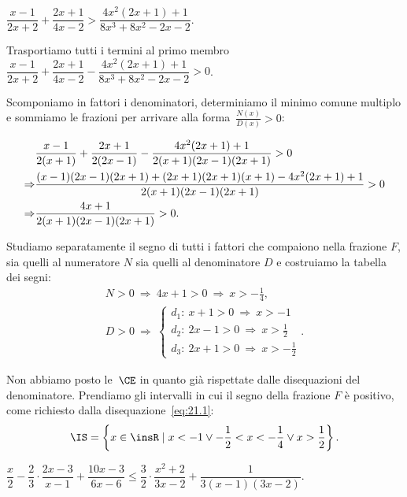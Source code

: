 \begin{exrig}
 \begin{esempio}
 $\dfrac{x-1}{2x+2}+\dfrac{2x+1}{4x-2}>\dfrac{4x^{2}(2x+1)+1}{8x^{3}+8x^{2}-2x-2}.$

Trasportiamo tutti i termini al primo membro~$\dfrac{x-1}{2x+2}+\dfrac{2x+1}{4x-2}-\dfrac{4x^{2}(2x+1)+1}{8x^{3}+8x^{2}-2x-2}>0$.

Scomponiamo in fattori i denominatori, determiniamo il minimo comune
multiplo e sommiamo le frazioni per arrivare alla forma~$\frac{N(x)}{D(x)}>0$:

\begin{align}
&\frac{x-1}{2(x+1)}+\frac{2x+1}{2(2x-1)}-\frac{4x^{2}(2x+1)+1}{2(x+1)(2x-1)(2x+1)}>0 \notag\\
\Rightarrow & \frac{(x-1)(2x-1)(2x+1)+(2x+1)(2x+1)(x+1)-4x^{2}(2x+1)+1}{2(x+1)(2x-1)(2x+1)}>0 \notag\\
\Rightarrow & \frac{4x+1}{2(x+1)(2x-1)(2x+1)}>0. \label{eq:21.1}
\end{align}

Studiamo separatamente il segno di tutti i fattori che compaiono nella
frazione $F$, sia quelli al numeratore $N$ sia quelli al denominatore $D$ e
costruiamo la tabella dei segni:
 \[\begin{gathered}
 N>0\:\Rightarrow\: 4x+1>0\:\Rightarrow\: x>-{\frac{1}{4}}\text{,}\\
 D>0\:\Rightarrow\:\left\{\begin{array}{l}
			d_1:\: x+1>0\:\Rightarrow\: x>-1 \\
			d_2:\: 2x-1>0\:\Rightarrow\: x>\frac{1}{2}\\
			d_3:\: 2x+1>0\:\Rightarrow\: x>-{\frac{1}{2}}
		  \end{array}\right..
\end{gathered}\]
\begin{center}

\end{center}
Non abbiamo posto le~$\CE$ in quanto già rispettate dalle disequazioni
del denominatore.
Prendiamo gli intervalli in cui il segno della frazione $F$ è positivo,
come richiesto dalla disequazione~\ref{eq:21.1}:
 \[\IS=\left\{x\in \insR\mid x<-1\vee -{\frac{1}{2}}<x<-{\frac{1}{4}}\vee x>\frac{1}{2}\right\}.\]
\end{esempio}

 \begin{esempio}
$\dfrac{x}{2}-\dfrac{2}{3}\cdot {\dfrac{2x-3}{x-1}}+\dfrac{10x-3}{6x-6}\le\dfrac{3}{2}\cdot {\dfrac{x^{2}+2}{3x-2}}+\dfrac{1}{3(x-1)(3x-2)}.$


\end{esempio}
\end{exrig}
